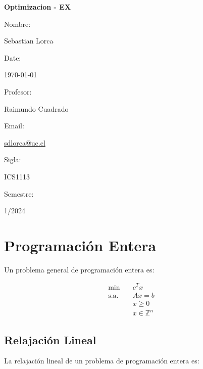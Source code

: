 \documentclass{article}
\begin{document}
\begin{titlepage}
    \centering
    \vspace*{2cm}
    {\Huge\bfseries Optimizacion - EX}\\[1cm]
    \vspace{1cm}
    {\Large Nombre: \par}
    {\large Sebastian Lorca\par}
    \vspace{0.5cm}
    {\Large Date: \par}
    {\large \today \par}
    \vspace{0.5cm}
    {\Large Profesor: \par}
    {\large Raimundo Cuadrado\par}
    \vspace{0.5cm}
    {\Large Email: \par}
    {\large \href{mailto:sdlorca@uc.cl}{sdlorca@uc.cl}\par}
    \vspace{0.5cm}
    {\Large Sigla: \par}
    {\large ICS1113\par}
    \vspace{0.5cm}
    {\Large Semestre: \par}
    {\large 1/2024\par}
    \vspace{1cm}
\end{titlepage}
\tableofcontents
\newpage


\section{Programaci\'on Entera}

Un problema general de programación entera es:

\begin{align*}
    \min \quad & c^T x \\
    \text{s.a.} \quad & Ax = b \\
    & x \geq 0 \\
    & x \in \mathbb{Z}^n
\end{align*}

\subsection{Relajación Lineal}

La relajación lineal de un problema de programación entera es:
\end{document}
